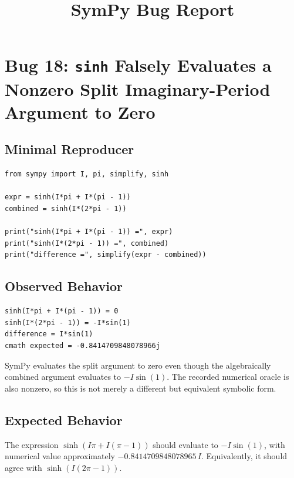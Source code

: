 \documentclass[11pt]{article}
\title{SymPy Bug Report}
\date{}
\begin{document}
\author{}
\maketitle

\section{Bug 18: \texttt{sinh} Falsely Evaluates a Nonzero Split Imaginary-Period Argument to Zero}

\subsection{Minimal Reproducer}

\medskip

\begin{lstlisting}[style=bugpython]
from sympy import I, pi, simplify, sinh

expr = sinh(I*pi + I*(pi - 1))
combined = sinh(I*(2*pi - 1))

print("sinh(I*pi + I*(pi - 1)) =", expr)
print("sinh(I*(2*pi - 1)) =", combined)
print("difference =", simplify(expr - combined))
\end{lstlisting}

\subsection{Observed Behavior}

\medskip

\begin{lstlisting}[style=bugpython]
sinh(I*pi + I*(pi - 1)) = 0
sinh(I*(2*pi - 1)) = -I*sin(1)
difference = I*sin(1)
cmath expected = -0.8414709848078966j
\end{lstlisting}

SymPy evaluates the split argument to zero even though the algebraically combined
argument evaluates to \(-I\sin(1)\). The recorded numerical oracle is also
nonzero, so this is not merely a different but equivalent symbolic form.

\subsection{Expected Behavior}

The expression \(\sinh(I\pi + I(\pi - 1))\) should evaluate to
\(-I\sin(1)\), with numerical value approximately
\(-0.8414709848078965\,I\). Equivalently, it should agree with
\(\sinh(I(2\pi - 1))\).
\end{document}
